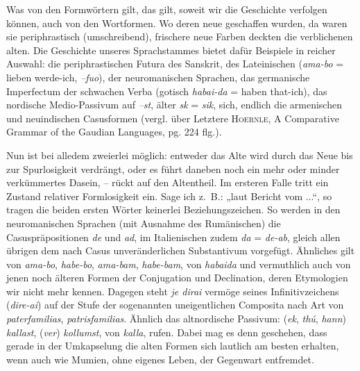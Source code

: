 {Was von den Formwörtern gilt, das gilt, soweit wir die Geschichte verfolgen können, auch von den Wortformen. Wo deren neue geschaffen wurden, da waren sie periphrastisch (umschreibend), frischere neue Farben deckten die verblichenen alten. Die Geschichte unseres Sprachstammes bietet dafür Beispiele in reicher Auswahl: die periphrastischen Futura des Sanskrit, des Lateinischen (\textit{ama-bo} = lieben werde-ich, \textit{–fuo}), der neuromanischen Sprachen, das germanische Imperfectum der schwachen Verba (gotisch \textit{habai-da} = haben that-ich), das nordische Medio-Passivum auf \textit{–st}, älter \textit{sk} = \textit{sik}, sich, endlich die armenischen und neuindischen Casusformen (vergl. über Letztere \textsc{Hoernle}, A Comparative Grammar of the Gaudian Languages, pg. 224 flg.).

Nun ist bei alledem zweierlei möglich: entweder das Alte wird durch das \label{sp.242} Neue bis zur Spurlosigkeit verdrängt, oder es führt daneben noch ein mehr oder minder verkümmertes Dasein, – rückt auf den Altentheil. Im ersteren Falle tritt ein Zustand relativer Formlosigkeit ein. Sage ich z.~B.: „laut Bericht vom ...“, so tragen die beiden ersten Wörter keinerlei Beziehungszeichen. So werden in den neuromanischen Sprachen (mit Ausnahme des Rumänischen) die Casuspräpositionen \textit{de} und \textit{ad}, im Italienischen zudem \textit{da} = \textit{de-ab}, gleich allen übrigen dem nach Casus unveränderlichen Substantivum vorgefügt. Ähnliches gilt von \textit{ama-bo}, \textit{habe-bo}, \textit{ama-bam}, \textit{habe-bam}, von \textit{habaida} und vermuthlich auch von jenen noch älteren Formen der Conjugation und Declination, deren Etymologien wir nicht mehr kennen. Dagegen steht \textit{je dirai} vermöge seines Infinitivzeichens (\textit{dire-ai}) auf der Stufe der sogenannten uneigentlichen Composita nach Art von \textit{paterfamilias}, \textit{patrisfamilias}. Ähnlich das altnordische Passivum: (\textit{ek}, \textit{thú}, \textit{hann}) \textit{kallast}, (\textit{ver}) \textit{kollumst}, von \textit{kalla}, rufen. Dabei mag es denn geschehen, dass gerade in der Umkapselung die alten Formen sich lautlich am besten erhalten, wenn auch wie Mumien, ohne eigenes Leben, der Gegenwart entfremdet.

}
